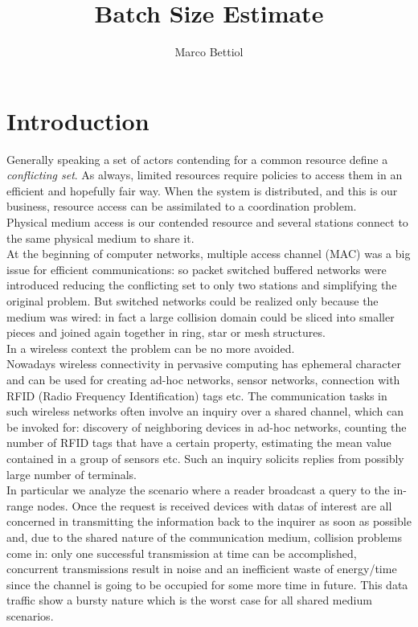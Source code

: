 \documentclass[12pt,a4paper,twocolumns]{report}
\author{Marco Bettiol}
\title{Batch Size Estimate}
\begin{document}



\tableofcontents
\listoffigures
\listoftables


\chapter{Introduction}

Generally speaking a set of actors contending for a common resource define a \emph{conflicting set}. As always, limited resources require policies to access them in an efficient and hopefully fair way. When the system is distributed, and this is our business, resource access can be assimilated to a coordination problem.\\ 
Physical medium access is our contended resource and several stations connect to the same physical medium to share it.\\ At the beginning of computer networks, multiple access channel (MAC) was a big issue for efficient communications: so packet switched buffered networks were introduced reducing the conflicting set to only two stations and simplifying  the original problem. But switched networks could be realized only because the medium was wired: in fact a large collision domain could be sliced into smaller pieces and joined again together in ring, star or mesh structures.\\ 
In a wireless context the problem can be no more avoided.\\  

Nowadays wireless connectivity in pervasive computing has ephemeral character and can be used for creating ad-hoc networks, sensor networks, connection with RFID (Radio Frequency Identification) tags etc. The communication tasks in such wireless networks often involve an inquiry over a shared channel, which can be invoked for: discovery of neighboring devices in ad-hoc networks, counting the number of RFID tags that have a certain property, estimating the mean value contained in a group of sensors etc. Such an inquiry solicits replies from possibly large number of terminals.\\

In particular we analyze the scenario where a reader broadcast a query to the in-range nodes. Once the request is received devices with datas of interest are all concerned in transmitting the information back to the inquirer as soon as possible and, due to the shared nature of the communication medium, collision problems come in: only one successful transmission at time can be accomplished, concurrent transmissions result in noise and an inefficient waste of energy/time since the channel is going to be occupied for some more time in future. This data traffic show a bursty nature which is the worst case for all shared medium scenarios.\\
\end{document}
